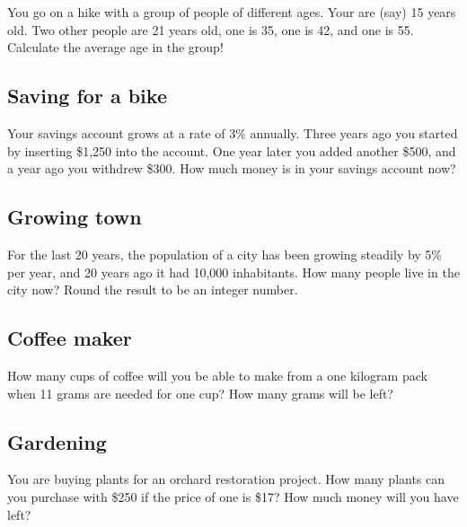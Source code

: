 You go on a hike with a group of people of different 
ages. Your are (say) 15 years old. Two other people 
are 21 years old, one is 35, one is 42, and one is 55.
Calculate the average age in the group!


\subsection{Saving for a bike}

Your savings account grows at a rate of 3\% annually. Three years ago you 
started by inserting \$1,250 into the account. One year later 
you added another \$500, and a year ago you withdrew \$300. 
How much money is in your savings account now?


\subsection{Growing town}

For the last 20 years, the population of a city has been growing 
steadily by 5\% per year, and 20 years ago it had 10,000 inhabitants.
How many people live in the city now? Round the result to be an 
integer number.


\subsection{Coffee maker}

How many cups of coffee will you be able to make from a one kilogram
pack when 11 grams are needed for one cup? How many grams will be 
left?


\subsection{Gardening}

You are buying plants for an orchard restoration project.
How many plants can you purchase with \$250 if the price 
of one is \$17? How much money will you have left?  


